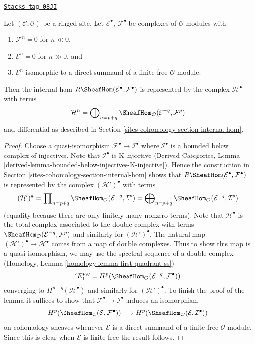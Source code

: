 \begin{lemma}
\label{sites-cohomology-lemma-Rhom-complex-of-direct-summands-finite-free}
\href{https://stacks.math.columbia.edu/tag/08JI}{\texttt{Stacks tag 08JI}}

Let $(\mathcal{C}, \mathcal{O})$ be a ringed site.
Let $\mathcal{E}^\bullet$, $\mathcal{F}^\bullet$ be complexes
of $\mathcal{O}$-modules with
\begin{enumerate}
\item $\mathcal{F}^n = 0$ for $n \ll 0$,
\item $\mathcal{E}^n = 0$ for $n \gg 0$, and
\item $\mathcal{E}^n$ isomorphic to a direct summand of a finite
free $\mathcal{O}$-module.
\end{enumerate}
Then the internal hom $R\SheafHom(\mathcal{E}^\bullet, \mathcal{F}^\bullet)$
is represented by the complex $\mathcal{H}^\bullet$ with terms
$$
\mathcal{H}^n =
\bigoplus\nolimits_{n = p + q}
\SheafHom_\mathcal{O}(\mathcal{E}^{-q}, \mathcal{F}^p)
$$
and differential as described in Section \ref{sites-cohomology-section-internal-hom}.
\end{lemma}

\begin{proof}
Choose a quasi-isomorphism $\mathcal{F}^\bullet \to \mathcal{I}^\bullet$
where $\mathcal{I}^\bullet$ is a bounded below complex of injectives.
Note that $\mathcal{I}^\bullet$ is K-injective
(Derived Categories, Lemma
\ref{derived-lemma-bounded-below-injectives-K-injective}).
Hence the construction in Section \ref{sites-cohomology-section-internal-hom}
shows that
$R\SheafHom(\mathcal{E}^\bullet, \mathcal{F}^\bullet)$ is
represented by the complex $(\mathcal{H}')^\bullet$ with terms
$$
(\mathcal{H}')^n =
\prod\nolimits_{n = p + q}
\SheafHom_\mathcal{O}(\mathcal{E}^{-q}, \mathcal{I}^p) =
\bigoplus\nolimits_{n = p + q}
\SheafHom_\mathcal{O}(\mathcal{E}^{-q}, \mathcal{I}^p)
$$
(equality because there are only finitely many nonzero terms).
Note that $\mathcal{H}^\bullet$ is the total complex associated to
the double complex with terms
$\SheafHom_\mathcal{O}(\mathcal{E}^{-q}, \mathcal{F}^p)$
and similarly for $(\mathcal{H}')^\bullet$.
The natural map $(\mathcal{H}')^\bullet \to \mathcal{H}^\bullet$
comes from a map of double complexes.
Thus to show this map is a quasi-isomorphism, we may use the spectral
sequence of a double complex
(Homology, Lemma \ref{homology-lemma-first-quadrant-ss})
$$
{}'E_1^{p, q} =
H^p(\SheafHom_\mathcal{O}(\mathcal{E}^{-q}, \mathcal{F}^\bullet))
$$
converging to $H^{p + q}(\mathcal{H}^\bullet)$ and similarly for
$(\mathcal{H}')^\bullet$. To finish the proof of the lemma it
suffices to show that $\mathcal{F}^\bullet \to \mathcal{I}^\bullet$
induces an isomorphism
$$
H^p(\SheafHom_\mathcal{O}(\mathcal{E}, \mathcal{F}^\bullet))
\longrightarrow
H^p(\SheafHom_\mathcal{O}(\mathcal{E}, \mathcal{I}^\bullet))
$$
on cohomology sheaves whenever $\mathcal{E}$ is a direct summand of a
finite free $\mathcal{O}$-module. Since this is clear when $\mathcal{E}$
is finite free the result follows.
\end{proof}

